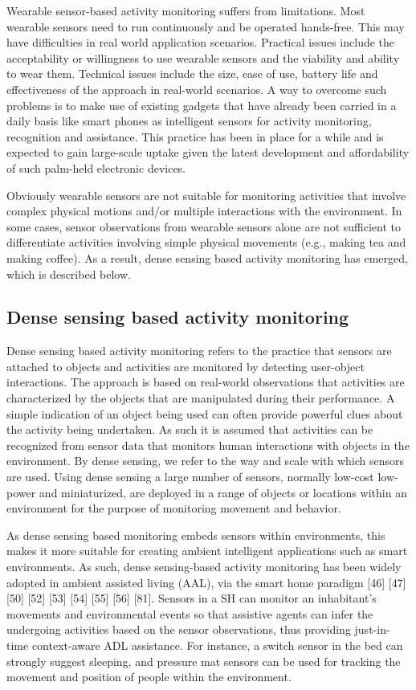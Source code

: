 Wearable sensor-based activity monitoring suffers from limitations. Most wearable sensors need to run continuously and be operated hands-free. This may have difficulties in real world application scenarios. Practical issues include the acceptability or willingness to use wearable sensors and the viability and ability to wear them. Technical issues include the size, ease of use, battery life and effectiveness of the approach in real-world scenarios. A way to overcome such problems is to make use of existing gadgets that have already been carried in a daily basis like smart phones as intelligent sensors for activity monitoring, recognition and assistance. This practice has been in place for a while \cite{Gellersen2002} \cite{Schmidt2001} and is expected to gain large-scale uptake given the latest development and affordability of such palm-held electronic devices.

Obviously wearable sensors are not suitable for monitoring activities that involve complex physical motions and/or multiple interactions with the environment. In some cases, sensor observations from wearable sensors alone are not sufficient to differentiate activities involving simple physical movements (e.g., making tea and making coffee). As a result, dense sensing based activity monitoring has emerged, which is described below.

\subsection{Dense sensing based activity monitoring}

Dense sensing based activity monitoring refers to the practice that sensors are attached to objects and activities are monitored by detecting user-object interactions. The approach is based on real-world observations that activities are characterized by the objects that are manipulated during their performance. A simple indication of an object being used can often provide powerful clues about the activity being undertaken. As such it is assumed that activities can be recognized from sensor data that monitors human interactions with objects in the environment. By dense sensing, we refer to the way and scale with which sensors are used. Using dense sensing a large number of sensors, normally low-cost low- power and miniaturized, are deployed in a range of objects or locations within an environment for the purpose of monitoring movement and behavior.

As dense sensing based monitoring embeds sensors within environments, this makes it more suitable for creating ambient intelligent applications such as smart environments. As such, dense sensing-based activity monitoring has been widely adopted in ambient assisted living (AAL), via the smart home paradigm [46] [47] [50] [52] [53] [54] [55] [56] [81]. Sensors in a SH can monitor an inhabitant’s movements and environmental events so that assistive agents can infer the undergoing activities based on the sensor observations, thus providing just-in-time context-aware ADL assistance. For instance, a switch sensor in the bed can strongly suggest sleeping, and pressure mat sensors can be used for tracking the movement and position of people within the environment.

